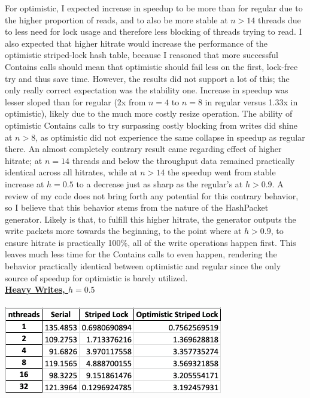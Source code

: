 \documentclass{article}
\begin{document}
\begin{adjustwidth}{-2cm}{-2cm}
For optimistic, I expected increase in speedup to be more than for regular due to the higher proportion of reads, and to also be more stable at $n>14$ threads due to less need for lock usage and therefore less blocking of threads trying to read. I also expected that higher hitrate would increase the performance of the optimistic striped-lock hash table, because I reasoned that more successful Contains calls should mean that optimistic should fail less on the first, lock-free try and thus save time. However, the results did not support a lot of this; the only really correct expectation was the stability one. Increase in speedup was lesser sloped than for regular (2x from $n=4$ to $n=8$ in regular versus 1.33x in optimistic), likely due to the much more costly resize operation. The ability of optimistic Contains calls to try surpassing costly blocking from writes did shine at $n>8$, as optimistic did not experience the same collapse in speedup as regular there. An almost completely contrary result came regarding effect of higher hitrate;  at $n=14$ threads and below the throughput data remained practically identical across all hitrates, while at $n>14$ the speedup went from stable increase at $h=0.5$ to a decrease just as sharp as the regular's at $h>0.9$. A review of my code does not bring forth any potential for this contrary behavior, so I believe that this behavior stems from the nature of the HashPacket generator. Likely is that, to fulfill this higher hitrate, the generator outputs the write packets more towards the beginning, to the point where at $h>0.9$, to ensure hitrate is practically 100\%, all of the write operations happen first. This leaves much less time for the Contains calls to even happen, rendering the behavior practically identical between optimistic and regular since the only source of speedup for optimistic is barely utilized.\\
\underline{\textbf{Heavy Writes, $h=0.5$}}\\
\null\\
\includegraphics[width=\linewidth]{e3_45_5_data.png}\\ \null\\

\end{adjustwidth}
\end{document}
